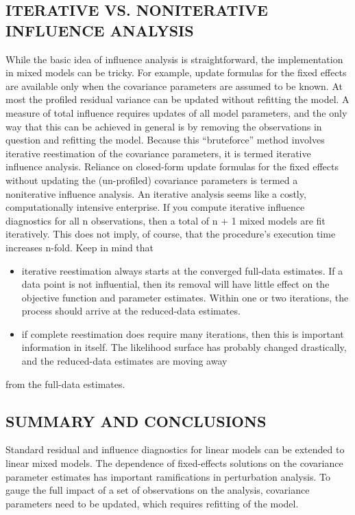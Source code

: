 \documentclass[Main.tex]{subfiles}
\begin{document}
\subsection{ITERATIVE VS. NONITERATIVE INFLUENCE ANALYSIS}
While the basic idea of influence analysis is straightforward, the implementation in mixed models can be
tricky. For example, update formulas for the fixed effects are available only when the covariance parameters
are assumed to be known. At most the profiled residual variance can be updated without refitting the model.
A measure of total influence requires updates of all model parameters, and the only way that this can be
achieved in general is by removing the observations in question and refitting the model. Because this “bruteforce”
method involves iterative reestimation of the covariance parameters, it is termed iterative influence
analysis. Reliance on closed-form update formulas for the fixed effects without updating the (un-profiled)
covariance parameters is termed a noniterative influence analysis.
An iterative analysis seems like a costly, computationally intensive enterprise. If you compute iterative
influence diagnostics for all n observations, then a total of n + 1 mixed models are fit iteratively. This does
not imply, of course, that the procedure’s execution time increases n-fold. Keep in mind that
\begin{itemize}
	\item iterative reestimation always starts at the converged full-data estimates. If a data point is not influential,
	then its removal will have little effect on the objective function and parameter estimates. Within
	one or two iterations, the process should arrive at the reduced-data estimates.
	\item if complete reestimation does require many iterations, then this is important information in itself. The
	likelihood surface has probably changed drastically, and the reduced-data estimates are moving away
\end{itemize}
from the full-data estimates.

\newpage
\subsection*{SUMMARY AND CONCLUSIONS}
Standard residual and influence diagnostics for linear models can be extended to linear mixed models. The
dependence of fixed-effects solutions on the covariance parameter estimates has important ramifications
in perturbation analysis. To gauge the full impact of a set of observations on the analysis, covariance
parameters need to be updated, which requires refitting of the model. 
\end{document}
